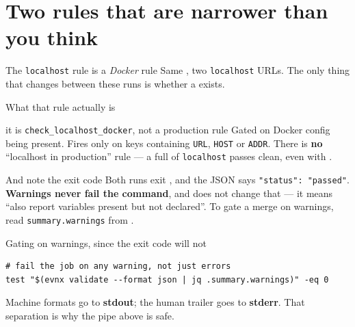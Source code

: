 \documentclass[aspectratio=169,10pt]{beamer}
\begin{document}
\section{Two rules that are narrower than you think}

\begin{frame}[fragile]{The \texttt{localhost} rule is a \emph{Docker} rule}
  Same , two \texttt{localhost} URLs. The only thing that changes
  between these runs is whether a  exists.

  \vspace{0.4em}
  \vspace{-0.3em}
\end{frame}

\begin{frame}{What that rule actually is}
  \begin{correction}{it is \texttt{check\_localhost\_docker}, not a production rule}
    Gated on Docker config being present. Fires only on keys containing
    \texttt{URL}, \texttt{HOST} or \texttt{ADDR}. There is \textbf{no}
    ``localhost in production'' rule --- a  full of
    \texttt{localhost} passes clean, even with .
  \end{correction}

  \vspace{0.8em}
  \begin{trap}{And note the exit code}
    Both runs exit \exitzero, and the JSON says
    \texttt{"status": "passed"}. \textbf{Warnings never fail the command}, and
     does not change that --- it means ``also report variables
    present but not declared''. To gate a merge on warnings, read
    \texttt{summary.warnings} from .
  \end{trap}
\end{frame}

\begin{frame}[fragile]{Gating on warnings, since the exit code will not}

  \vspace{0.4em}
\begin{lstlisting}[style=evnxcode]
# fail the job on any warning, not just errors
test "$(evnx validate --format json | jq .summary.warnings)" -eq 0
\end{lstlisting}

  {\footnotesize Machine formats go to \textbf{stdout}; the human trailer goes
  to \textbf{stderr}. That separation is why the pipe above is safe.}
\end{frame}
\end{document}
